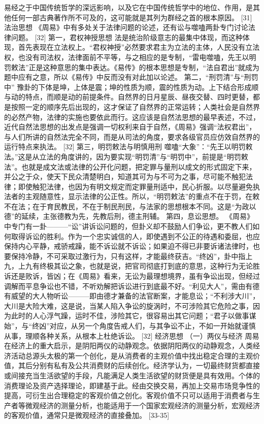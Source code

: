 \documentclass[12pt,UTF8]{ctexbook}
\begin{document}
易经之于中国传统哲学的深远影响，以及它在中国传统哲学中的地位、作用，是其他任何一部古典著作所不可及的，这可能就是其列为群经之首的根本原因。 [31]
法治思想
《周易》中有多处关于法律问题的论述，还有讼与噬嗑两卦专门讨论法律问题。 [32]
第一，君权神授思想
法是统治阶级意志的最集中体现，而这种体现，首先表现在立法权上。“君权神授”必然要求君主为立法的主体，人民没有立法权，也没有司法权，法律面前不平等，与之相应的是专制，“雷电噬嗑，先王以明罚敕法”正是这种意思的集中表达。《易传》的根本思想是专制，“法自君出”就成为题中应有之意，所以《易传》中反而没有对此加以论述。
第二，“刑罚清”与“刑罚中”
豫卦的下体是坤，上体是震；坤的性质为顺，震的性质为动。上下结合形成顺与动的特点，而顺是动的前提条件。自然界的日月星辰、昼夜交替、四时更替，都是按照一定的顺序先后出现的，这才保证了自然界的正常运转；人类社会是自然界的必然产物，法律的实施也要依此而行。这应该是自然法思想的最早表述，不过，近代自然法思想的出发点是强调一切权利来自于自然，《周易》强调“法权君出”，与人们所讲的自然法完全不同，而是从司法的角度，要求各级官员应仿效自然界的运行特点来执法。 [32]
第三，明罚敕法与明慎用刑
噬嗑“大象”：“先王以明罚敕法。”这是从立法的角度讲的，因为要实现“明罚清”与“明罚中”，前提是“明罚敕法”。也就是成文法或法律的公开化问题，把定罪与量刑以成文的形式固定下来，并公之于众，使天下民众清楚明白，知道其可为与不可为之事，尽可能不触犯法律；即使触犯法律，也因为有明文规定而定罪量刑适中，民心折服。以尽量避免执法者的主观随意性，显示法律的公正性。所以，“明罚敕法”的重点不在于罚，在敕不在法；在于育民教民，不在于制民刑民，与法家的思想根本不同。这是“为政以德”的延续，主张德教为先，先教后刑，德主刑辅。
第四，息讼思想。
《周易》中专门有一卦———“讼”讲诉讼问题的，但卦义却不鼓励人们争讼，更不教人们如何取得诉讼的胜利。作为一个忠实诚信的人，即使遇到不公正的待遇和委屈，也应保持内心平静，戒骄戒躁，能不诉讼就不诉讼；如果迫不得已非要诉诸法律时，也要保持冷静，不可采取过激行为，只有这样，才能最终获吉。“终凶”，卦中指上九，上九有终极其讼之象，也就是说，把官司彻底打到底的意思，这种行为无论胜诉还是败诉，皆凶；在《周易》看来，无讼为最理想境界，虽有争讼出现，但经过调解而平息争讼也不错，不听劝解把诉讼进行到底最不好。“利见大人”，需由有德有威望的大人物听讼———即由德才兼备的法官断案，才能息讼；“不利涉大川”，大川是大险大难，这是说，当某人陷入争讼的旋涡时，不可涉险其它危险之事，因为此时的人心浮气躁，运时不佳，涉险其它，很容易出其它问题；“君子以做事谋始”，与“终凶”对应，从另一个角度告戒人们，与其争讼不止，不如一开始就谨慎从事，理顺各种关系，从根本上杜绝诉讼。 [32]
经济思想
（一）两仪与经济
周易在经济上的重大启示，是阴阳两仪的动静观念。依据阴阳两仪的动静观念，人类经济活动总源头太极的第一个创化，是从消费者的主观价值中找出稳定合理的主观价值，其后分别有私有及公共消费财的后续创化。经济学认为，一切最终财货都直接或间接充当生活欲望的手段，凡能满足人类生活欲望的财货便是具有效用。个体的消费理论及资产选择理论，即建基于此。经由交换交易，再加上交易市场竞争性的提高，可衍生出合理稳定的客观价值之创化。客观价值不只可以适用于消费者与生产者等微观经济的测量分析，也能适用于一个国家宏观经济的测量分析，宏观经济的客观价值，通常只是微观经济的直接叠加。 [33-35]
\end{document}
